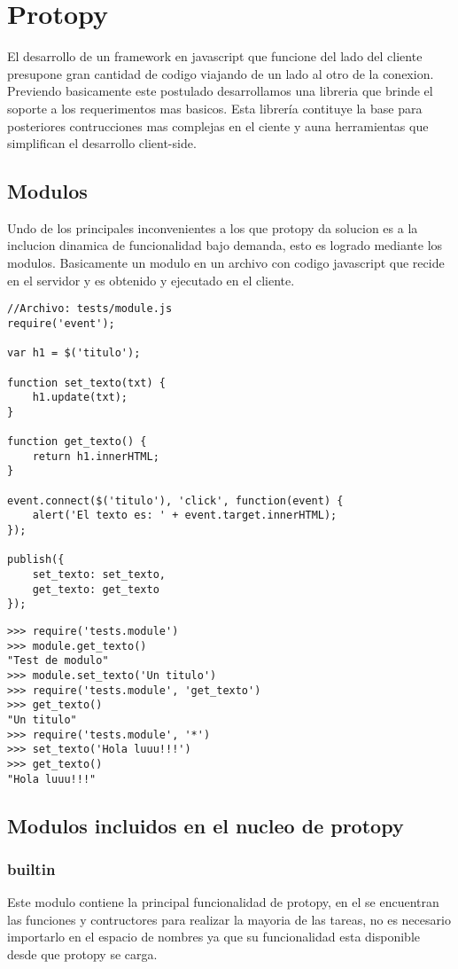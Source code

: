 \chapter{Protopy}
El desarrollo de un framework en javascript que funcione del lado del cliente
presupone gran cantidad de codigo
viajando de un lado al otro de la conexion. Previendo basicamente este postulado
desarrollamos una libreria
que brinde el soporte a los requerimentos mas basicos.
Esta librería contituye la base para posteriores contrucciones mas complejas en
el ciente y auna herramientas
que simplifican el desarrollo client-side.

\section{Modulos}
Undo de los principales inconvenientes a los que protopy da solucion es a la
inclucion dinamica de funcionalidad bajo demanda,
esto es logrado mediante los modulos.
Basicamente un modulo en un archivo con codigo javascript que recide en el
servidor y es obtenido y ejecutado en el cliente.

\begin{lstlisting}[style=javascript,label=estructura-modulo,caption=Estructura
de un modulo]
//Archivo: tests/module.js
require('event');

var h1 = $('titulo');

function set_texto(txt) {
    h1.update(txt);
}

function get_texto() {
    return h1.innerHTML;
}

event.connect($('titulo'), 'click', function(event) {
    alert('El texto es: ' + event.target.innerHTML);
});

publish({
    set_texto: set_texto,
    get_texto: get_texto
});
\end{lstlisting}

\begin{lstlisting}[style=consola]
>>> require('tests.module')
>>> module.get_texto()
"Test de modulo"
>>> module.set_texto('Un titulo')
>>> require('tests.module', 'get_texto')
>>> get_texto()
"Un titulo"
>>> require('tests.module', '*')
>>> set_texto('Hola luuu!!!')
>>> get_texto()
"Hola luuu!!!"
\end{lstlisting}

\section{Modulos incluidos en el nucleo de protopy}
\subsection{builtin}
Este modulo contiene la principal funcionalidad de protopy, en el se encuentran
las funciones y contructores para realizar la mayoria de las tareas, no es
necesario importarlo en el espacio de nombres ya que su funcionalidad esta
disponible desde que protopy se carga.


